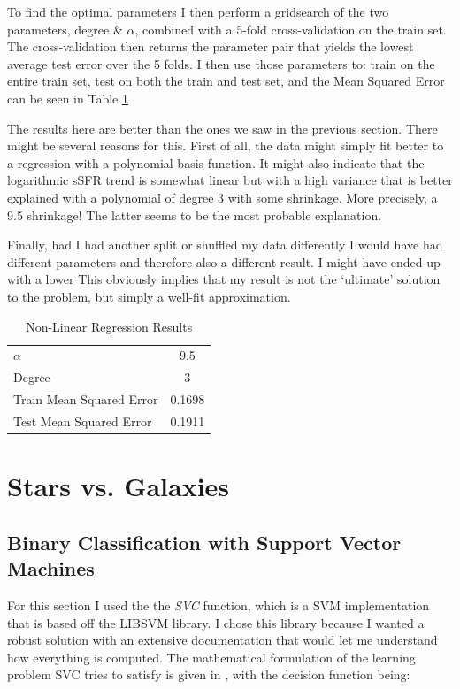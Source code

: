 \documentclass{article}
\theoremstyle{plain}
\theoremstyle{nonumberplain}
\begin{document}
To find the optimal parameters I then perform a gridsearch of the two parameters, degree \& $\alpha$, combined with a 5-fold cross-validation on the train set.
The cross-validation then returns the parameter pair that yields the lowest average test error over the 5 folds. 
I then use those parameters to: train on the entire train set, test on both the train and test set, and the Mean Squared Error can be seen in Table \ref{table:non-linear}

The results here are better than the ones we saw in the previous section.
There might be several reasons for this.
First of all, the data might simply fit better to a regression with a polynomial basis function.
It might also indicate that the logarithmic sSFR trend is somewhat linear but with a high variance that is better explained with a polynomial of degree 3 with some shrinkage.
More precisely, a 9.5 shrinkage!
The latter seems to be the most probable explanation.

Finally, had I had another split or shuffled my data differently I would have had different parameters and therefore also a different result. 
I might have ended up with a lower 
This obviously implies that my result is not the `ultimate' solution to the problem, but simply a well-fit approximation. 

\begin{table}[htb]
\centering
\caption{Non-Linear Regression Results}
\label{table:non-linear}
\begin{tabular}{l|c}
	\hline \hline
	$\alpha$ & 9.5 \\
	Degree & 3 \\
	Train Mean Squared Error & 0.1698 \\
	Test Mean Squared Error & 0.1911 \\
\end{tabular}
\end{table}

\section{Stars vs. Galaxies}

\subsection{Binary Classification with Support Vector Machines}


For this section I used the the \textit{SVC}\cite{website:svm-sklearn} function, which is a SVM implementation that is based off the LIBSVM \cite{website:libsvm} library.
I chose this library because I wanted a robust solution with an extensive documentation that would let me understand how everything is computed. 
The mathematical formulation of the learning problem SVC tries to satisfy is given in \cite[1.2.7.1. SVC]{website:svm-sklearn}, with the decision function being:
\end{document}
